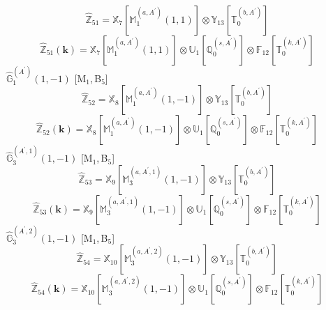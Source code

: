 \documentclass[fleqn,10pt,landscape]{article}
\begin{document}
\begin{itemize}
\begin{dmath*}
\hat{\mathbb{Z}}_{51}=\mathbb{X}_{7}[\mathbb{M}_{1}^{(a,A^{\prime})}(1,1)] \otimes\mathbb{Y}_{13}[\mathbb{T}_{0}^{(b,A^{\prime})}]
\end{dmath*}
\begin{dmath*}
\hat{\mathbb{Z}}_{51}(\bm{k})=\mathbb{X}_{7}[\mathbb{M}_{1}^{(a,A^{\prime})}(1,1)] \otimes\mathbb{U}_{1}[\mathbb{Q}_{0}^{(s,A^{\prime})}] \otimes\mathbb{F}_{12}[\mathbb{T}_{0}^{(k,A^{\prime})}]
\end{dmath*}
\vspace{4mm}
\noindent {} $\,\,\,\hat{\mathbb{G}}_{1}^{(A^{\prime})}(1,-1)$ [M$_{1}$,\,B$_{5}$]
\begin{dmath*}
\hat{\mathbb{Z}}_{52}=\mathbb{X}_{8}[\mathbb{M}_{1}^{(a,A^{\prime})}(1,-1)] \otimes\mathbb{Y}_{13}[\mathbb{T}_{0}^{(b,A^{\prime})}]
\end{dmath*}
\begin{dmath*}
\hat{\mathbb{Z}}_{52}(\bm{k})=\mathbb{X}_{8}[\mathbb{M}_{1}^{(a,A^{\prime})}(1,-1)] \otimes\mathbb{U}_{1}[\mathbb{Q}_{0}^{(s,A^{\prime})}] \otimes\mathbb{F}_{12}[\mathbb{T}_{0}^{(k,A^{\prime})}]
\end{dmath*}
\vspace{4mm}
\noindent {} $\,\,\,\hat{\mathbb{G}}_{3}^{(A^{\prime},1)}(1,-1)$ [M$_{1}$,\,B$_{5}$]
\begin{dmath*}
\hat{\mathbb{Z}}_{53}=\mathbb{X}_{9}[\mathbb{M}_{3}^{(a,A^{\prime},1)}(1,-1)] \otimes\mathbb{Y}_{13}[\mathbb{T}_{0}^{(b,A^{\prime})}]
\end{dmath*}
\begin{dmath*}
\hat{\mathbb{Z}}_{53}(\bm{k})=\mathbb{X}_{9}[\mathbb{M}_{3}^{(a,A^{\prime},1)}(1,-1)] \otimes\mathbb{U}_{1}[\mathbb{Q}_{0}^{(s,A^{\prime})}] \otimes\mathbb{F}_{12}[\mathbb{T}_{0}^{(k,A^{\prime})}]
\end{dmath*}
\vspace{4mm}
\noindent {} $\,\,\,\hat{\mathbb{G}}_{3}^{(A^{\prime},2)}(1,-1)$ [M$_{1}$,\,B$_{5}$]
\begin{dmath*}
\hat{\mathbb{Z}}_{54}=\mathbb{X}_{10}[\mathbb{M}_{3}^{(a,A^{\prime},2)}(1,-1)] \otimes\mathbb{Y}_{13}[\mathbb{T}_{0}^{(b,A^{\prime})}]
\end{dmath*}
\begin{dmath*}
\hat{\mathbb{Z}}_{54}(\bm{k})=\mathbb{X}_{10}[\mathbb{M}_{3}^{(a,A^{\prime},2)}(1,-1)] \otimes\mathbb{U}_{1}[\mathbb{Q}_{0}^{(s,A^{\prime})}] \otimes\mathbb{F}_{12}[\mathbb{T}_{0}^{(k,A^{\prime})}]
\end{dmath*}

\end{itemize}
\end{document}
